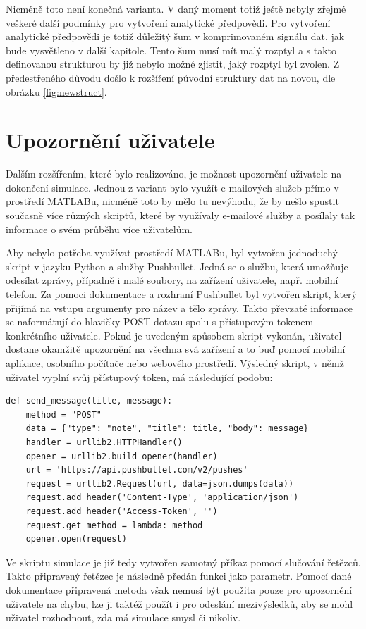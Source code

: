 \documentclass[FM,BP]{tulthesis}
\begin{document}
Nicméně toto není konečná varianta. V daný moment totiž ještě nebyly zřejmé veškeré další podmínky pro vytvoření analytické předpovědi. Pro vytvoření analytické předpovědi je totiž důležitý šum v komprimovaném signálu dat, jak bude vysvětleno v další kapitole. Tento šum musí mít malý rozptyl a s takto definovanou strukturou by již nebylo možné zjistit, jaký rozptyl byl zvolen. Z předestřeného důvodu došlo k rozšíření původní struktury dat na novou, dle obrázku \ref{fig:newstruct}.

\section{Upozornění uživatele}
\label{subch:notifications}
Dalším rozšířením, které bylo realizováno, je možnost upozornění uživatele na dokončení simulace. Jednou z variant bylo využít e-mailových služeb přímo v prostředí MATLABu, nicméně toto by mělo tu nevýhodu, že by nešlo spustit současně více různých skriptů, které by využívaly e-mailové služby a posílaly tak informace o svém průběhu více uživatelům. 

Aby nebylo potřeba využívat prostředí MATLABu, byl vytvořen jednoduchý skript v jazyku Python a služby Pushbullet. Jedná se o službu, která umožňuje odesílat zprávy, případně i malé soubory, na zařízení uživatele, např. mobilní telefon. Za pomoci dokumentace a rozhraní Pushbullet byl vytvořen skript, který přijímá na vstupu argumenty pro název a tělo zprávy. Takto převzaté informace se naformátují do hlavičky POST dotazu spolu s přístupovým tokenem konkrétního uživatele. Pokud je uvedeným způsobem skript vykonán, uživatel dostane okamžitě upozornění na všechna svá zařízení a to buď pomocí mobilní aplikace, osobního počítače nebo webového prostředí. Výsledný skript, v němž uživatel vyplní svůj přístupový token, má následující podobu:

\begin{lstlisting}
def send_message(title, message):
	method = "POST"
	data = {"type": "note", "title": title, "body": message}
	handler = urllib2.HTTPHandler()
	opener = urllib2.build_opener(handler)
	url = 'https://api.pushbullet.com/v2/pushes'
	request = urllib2.Request(url, data=json.dumps(data))
	request.add_header('Content-Type', 'application/json')
	request.add_header('Access-Token', '')
	request.get_method = lambda: method
	opener.open(request)
\end{lstlisting}

Ve skriptu simulace je již tedy vytvořen samotný příkaz pomocí slučování řetězců. Takto připravený řetězec je následně předán funkci  jako parametr. Pomocí dané dokumentace připravená metoda však nemusí být použita pouze pro upozornění uživatele na chybu, lze ji taktéž použít i pro odeslání mezivýsledků, aby se mohl uživatel rozhodnout, zda má simulace smysl či nikoliv. 
\end{document}
